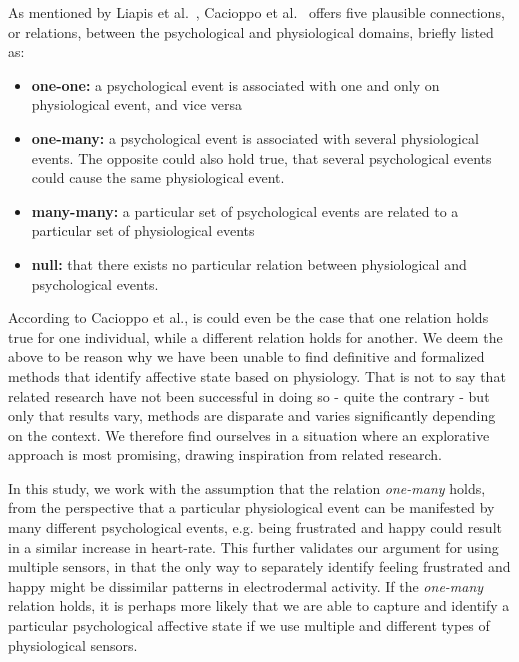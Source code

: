 As mentioned by Liapis et al.~\cite{fusion4}, Cacioppo et al.~\cite[p. 8-9]{handbook-psychophysiology} offers five
plausible connections, or relations, between the psychological and physiological domains, briefly listed as:

\begin{itemize}[noitemsep, nolistsep]
\item \textbf{one-one:} a psychological event is associated with one and only on physiological event, and vice versa
\item \textbf{one-many:} a psychological event is associated with several physiological events. The opposite could also
  hold true, that several psychological events could cause the same physiological event.
\item \textbf{many-many:} a particular set of psychological events are related to a particular set of physiological
  events
\item \textbf{null:} that there exists no particular relation between physiological and psychological events.
\end{itemize}

According to Cacioppo et al., is could even be the case that one relation holds true for one individual, while a
different relation holds for another.  We deem the above to be reason why we have been unable to find definitive and
formalized methods that identify affective state based on physiology. That is not to say that related research have not
been successful in doing so - quite the contrary - but only that results vary, methods are disparate and varies
significantly depending on the context. We therefore find ourselves in a situation where an explorative approach is most
promising, drawing inspiration from related research.

In this study, we work with the assumption that the relation \textit{one-many} holds, from the perspective that a
particular physiological event can be manifested by many different psychological events, e.g. being frustrated and happy
could result in a similar increase in heart-rate. This further validates our argument for using multiple sensors, in
that the only way to separately identify feeling frustrated and happy might be dissimilar patterns in electrodermal
activity. If the \textit{one-many} relation holds, it is perhaps more likely that we are able to capture and identify a
particular psychological affective state if we use multiple and different types of physiological sensors.

